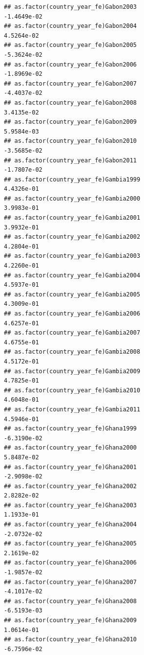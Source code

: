 \documentclass[
  a4paper,
]{article}
\begin{document}
\begin{verbatim}
## as.factor(country_year_fe)Gabon2003                            -1.4649e-02
## as.factor(country_year_fe)Gabon2004                             4.5264e-02
## as.factor(country_year_fe)Gabon2005                            -5.3624e-02
## as.factor(country_year_fe)Gabon2006                            -1.8969e-02
## as.factor(country_year_fe)Gabon2007                            -4.4037e-02
## as.factor(country_year_fe)Gabon2008                             3.4135e-02
## as.factor(country_year_fe)Gabon2009                             5.9584e-03
## as.factor(country_year_fe)Gabon2010                            -3.5685e-02
## as.factor(country_year_fe)Gabon2011                            -1.7807e-02
## as.factor(country_year_fe)Gambia1999                            4.4326e-01
## as.factor(country_year_fe)Gambia2000                            3.9983e-01
## as.factor(country_year_fe)Gambia2001                            3.9932e-01
## as.factor(country_year_fe)Gambia2002                            4.2804e-01
## as.factor(country_year_fe)Gambia2003                            4.2260e-01
## as.factor(country_year_fe)Gambia2004                            4.5937e-01
## as.factor(country_year_fe)Gambia2005                            4.3009e-01
## as.factor(country_year_fe)Gambia2006                            4.6257e-01
## as.factor(country_year_fe)Gambia2007                            4.6755e-01
## as.factor(country_year_fe)Gambia2008                            4.5172e-01
## as.factor(country_year_fe)Gambia2009                            4.7825e-01
## as.factor(country_year_fe)Gambia2010                            4.6048e-01
## as.factor(country_year_fe)Gambia2011                            4.5946e-01
## as.factor(country_year_fe)Ghana1999                            -6.3190e-02
## as.factor(country_year_fe)Ghana2000                             5.8487e-02
## as.factor(country_year_fe)Ghana2001                            -2.9098e-02
## as.factor(country_year_fe)Ghana2002                             2.8282e-02
## as.factor(country_year_fe)Ghana2003                             1.1933e-01
## as.factor(country_year_fe)Ghana2004                            -2.0732e-02
## as.factor(country_year_fe)Ghana2005                             2.1619e-02
## as.factor(country_year_fe)Ghana2006                            -1.9857e-02
## as.factor(country_year_fe)Ghana2007                            -4.1017e-02
## as.factor(country_year_fe)Ghana2008                            -6.5193e-03
## as.factor(country_year_fe)Ghana2009                             1.0614e-01
## as.factor(country_year_fe)Ghana2010                            -6.7596e-02

\end{verbatim}
\end{document}
